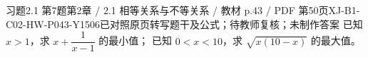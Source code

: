 \par\noindent\begin{minipage}{\linewidth}
\begin{bankitem}{习题2.1 第7题}{第2章 / 2.1 相等关系与不等关系 / 教材 p.43 / PDF 第50页}{XJ-B1-C02-HW-P043-Y1506}{已对照原页转写题干及公式；待教师复核；未制作答案}
已知 $x>1$，求 $x+\dfrac1{x-1}$ 的最小值；
已知 $0<x<10$，求 $\sqrt{x(10-x)}$ 的最大值。
\end{bankitem}
\end{minipage}\par\medskip
